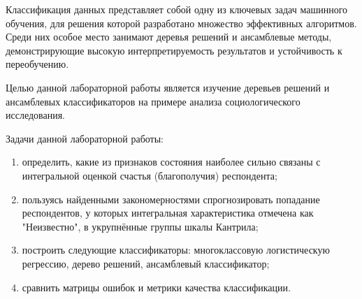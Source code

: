 
Классификация данных представляет собой одну из ключевых задач машинного обучения, для решения которой разработано множество эффективных алгоритмов. Среди них особое место занимают деревья решений и ансамблевые методы, демонстрирующие высокую интерпретируемость результатов и устойчивость к переобучению.

Целью данной лабораторной работы является изучение деревьев решений и ансамблевых классификаторов на примере анализа социологического исследования.

Задачи данной лабораторной работы:
\begin{enumerate}[label*=\arabic*)]
	\item определить, какие из признаков состояния наиболее сильно связаны с интегральной оценкой счастья (благополучия) респондента;
	\item пользуясь найденными закономерностями спрогнозировать попадание респондентов, у которых интегральная характеристика отмечена как "Неизвестно", в укрупнённые группы шкалы Кантрила;
	\item построить следующие классификаторы: многоклассовую логистическую регрессию, дерево решений, ансамблевый классификатор;
	\item сравнить матрицы ошибок и метрики качества классификации.
\end{enumerate}

\clearpage
